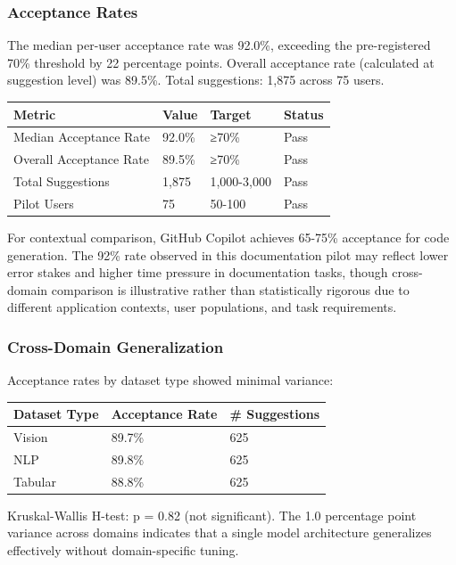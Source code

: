
\subsubsection{Acceptance Rates}

The median per-user acceptance rate was 92.0\%, exceeding the pre-registered 70\% threshold by 22 percentage points. Overall acceptance rate (calculated at suggestion level) was 89.5\%. Total suggestions: 1,875 across 75 users.

\begin{table}[htbp]
\centering
\begin{tabular}{llll}
\toprule
Metric & Value & Target & Status \\
\midrule
Median Acceptance Rate & 92.0\% & ≥70\% & Pass \\
Overall Acceptance Rate & 89.5\% & ≥70\% & Pass \\
Total Suggestions & 1,875 & 1,000-3,000 & Pass \\
Pilot Users & 75 & 50-100 & Pass \\
\bottomrule
\end{tabular}
\end{table}

For contextual comparison, GitHub Copilot achieves 65-75\% acceptance for code generation. The 92\% rate observed in this documentation pilot may reflect lower error stakes and higher time pressure in documentation tasks, though cross-domain comparison is illustrative rather than statistically rigorous due to different application contexts, user populations, and task requirements.

\subsubsection{Cross-Domain Generalization}

Acceptance rates by dataset type showed minimal variance:

\begin{table}[htbp]
\centering
\begin{tabular}{lll}
\toprule
Dataset Type & Acceptance Rate & \# Suggestions \\
\midrule
Vision & 89.7\% & 625 \\
NLP & 89.8\% & 625 \\
Tabular & 88.8\% & 625 \\
\bottomrule
\end{tabular}
\end{table}

Kruskal-Wallis H-test: p = 0.82 (not significant). The 1.0 percentage point variance across domains indicates that a single model architecture generalizes effectively without domain-specific tuning.

